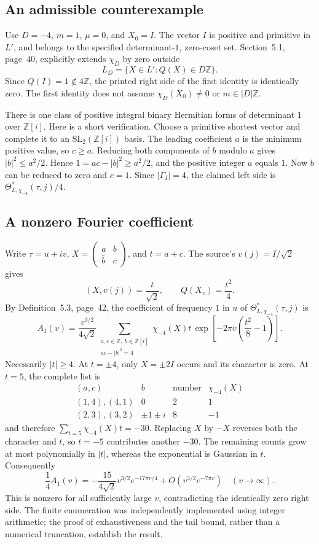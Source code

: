 \documentclass[10pt]{article}
\begin{document}
\subsection*{An admissible counterexample}
Use \(D=-4\), \(m=1\), \(\mu=0\), and \(X_0=I\). The vector \(I\) is positive and primitive in \(L'\), and belongs to the specified determinant-\(1\), zero-coset set. Section 5.1, page 40, explicitly extends \(\chi_D\) by zero outside \[L_D=\{X\in L':Q(X)\in D\mathbb Z\}.\] Since \(Q(I)=1\notin4\mathbb Z\), the printed right side of the first identity is identically zero. The first identity does not assume \(\chi_D(X_0)\ne0\) or \(m\in |D|\mathbb Z\).\par
There is one class of positive integral binary Hermitian forms of determinant \(1\) over \(\mathbb Z[i]\). Here is a short verification. Choose a primitive shortest vector and complete it to an \(\mathrm{SL}_2(\mathbb Z[i])\) basis. The leading coefficient \(a\) is the minimum positive value, so \(c\geq a\). Reducing both components of \(b\) modulo \(a\) gives \(|b|^2\leq a^2/2\). Hence \(1=ac-|b|^2\geq a^2/2\), and the positive integer \(a\) equals \(1\). Now \(b\) can be reduced to zero and \(c=1\). Since \(|\Gamma_I|=4\), the claimed left side is \(\Theta^*_{L,\chi_{-4}}(\tau,j)/4\).\par
\subsection*{A nonzero Fourier coefficient}
Write \(\tau=u+iv\), \(X=\left(\begin{smallmatrix}a&b\\\bar b&c\end{smallmatrix}\right)\), and \(t=a+c\). The source’s \(v(j)=I/\sqrt2\) gives \[(X,v(j))=\frac{t}{\sqrt2},\qquad Q(X_v)=\frac{t^2}{4}.\] By Definition 5.3, page 42, the coefficient of frequency \(1\) in \(u\) of \(\Theta^*_{L,\chi_{-4}}(\tau,j)\) is \[A_1(v)=\frac{v^{3/2}}{4\sqrt2}
   \sum_{\substack{a,c\in\mathbb Z,\ b\in\mathbb Z[i]\\ac-|b|^2=4}}
   \chi_{-4}(X)t\,
   \exp\!\left[-2\pi v\left(\frac{t^2}{8}-1\right)\right].\] Necessarily \(|t|\geq4\). At \(t=\pm4\), only \(X=\pm2I\) occurs and its character is zero. At \(t=5\), the complete list is \[\begin{array}{c|c|c|c}
(a,c)&b&\text{number}&\chi_{-4}(X)\\ \hline
(1,4),(4,1)&0&2&1\\
(2,3),(3,2)&\pm1\pm i&8&-1
\end{array}\] and therefore \(\sum_{t=5}\chi_{-4}(X)t=-30\). Replacing \(X\) by \(-X\) reverses both the character and \(t\), so \(t=-5\) contributes another \(-30\). The remaining counts grow at most polynomially in \(|t|\), whereas the exponential is Gaussian in \(t\). Consequently \[\frac14 A_1(v)=
 -\frac{15}{4\sqrt2}v^{3/2}e^{-17\pi v/4}
 +O\!\left(v^{3/2}e^{-7\pi v}\right)
 \quad(v\longrightarrow\infty).\] This is nonzero for all sufficiently large \(v\), contradicting the identically zero right side. The finite enumeration was independently implemented using integer arithmetic; the proof of exhaustiveness and the tail bound, rather than a numerical truncation, establish the result.\par
\end{document}
